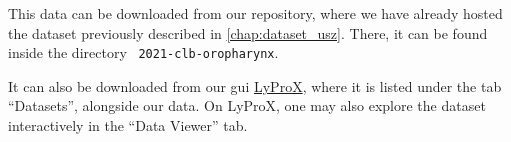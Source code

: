 \begin{tcolorbox}[
    title=\faIcon{database} Data,
    parbox=false,
    float
]
    This data can be downloaded from our  repository, where we have already hosted the dataset previously described in \cref{chap:dataset_usz}. There, it can be found inside the directory ~\texttt{2021-clb-oropharynx}.

    It can also be downloaded from our \gls{gui} \href{https://lyprox.org}{ LyProX}, where it is listed under the tab ``Datasets'', alongside our data. On LyProX, one may also explore the dataset interactively in the ``Data Viewer'' tab.
\end{tcolorbox}

